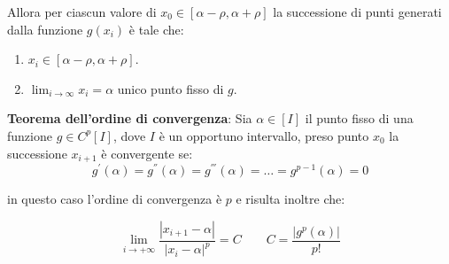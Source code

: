 \documentclass[12pt, a4paper]{book}
\theoremstyle{definition}
\begin{document}
\begin{flushleft}
Allora per ciascun valore di $x_{0} \in [\alpha - \rho,\alpha + \rho]$ la successione di punti generati dalla funzione $g(x_{i})$ è tale che:
\begin{enumerate}
	\item $x_{i} \in [\alpha - \rho,\alpha + \rho]$.
	\item $\lim_{i \rightarrow \infty} x_{i} = \alpha $ unico punto fisso di $g$.
\end{enumerate} 
\vspace{1em}
\textbf{Teorema dell'ordine di convergenza}:
Sia $\alpha \in [I]$ il punto fisso di una funzione $g \in C^{p}[I]$, dove $I$ è un opportuno intervallo,  preso punto $x_{0}$ la successione $x_{i+1}$ è convergente se:
\[	
	g^{'}(\alpha) = g^{''}(\alpha) = g^{'''}(\alpha) = \dots = g^{p-1}(\alpha) = 0 
\]

in questo caso l'ordine di convergenza è $p$ e risulta inoltre che:

\[ 	
	\lim_{i \rightarrow +\infty} \dfrac{|x_{i+1} - \alpha|}{|x_{i} - \alpha|^{p}} = C  \quad \quad C = \dfrac{|g^{p}(\alpha)|}{p!}
\]
\end{flushleft}
\end{document}
